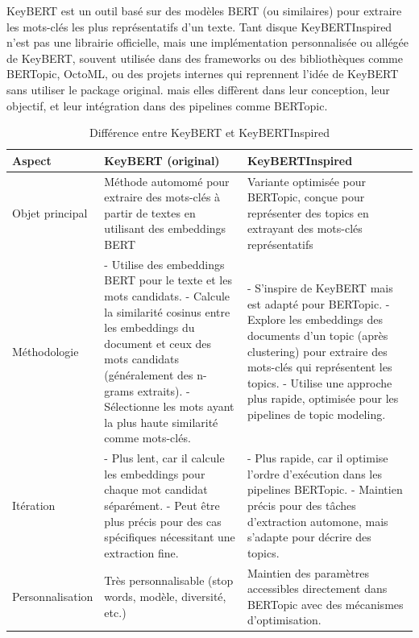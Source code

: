\documentclass[mstat,12pt]{unswthesis}
\begin{document}
\begin{enumerate}
\begin{enumerate}
        \bigskip

        KeyBERT est un outil basé sur des modèles BERT (ou similaires) pour extraire les mots-clés les plus représentatifs d’un texte. Tant disque KeyBERTInspired n’est pas une librairie officielle, mais une implémentation personnalisée ou allégée de KeyBERT, souvent utilisée dans des frameworks ou des bibliothèques comme BERTopic, OctoML, ou des projets internes qui reprennent l'idée de KeyBERT sans utiliser le package original. mais elles diffèrent dans leur conception, leur objectif, et leur intégration dans des pipelines comme BERTopic.


        \begin{table}[H]
        \centering
            \caption{Différence entre KeyBERT et KeyBERTInspired}
            \begin{tabular}{|p{3cm}|p{5cm}|p{5cm}|}
                \hline
                \textbf{Aspect} & \textbf{KeyBERT (original)} & \textbf{KeyBERTInspired} \\
                \hline
                Objet principal & Méthode automomé pour extraire des mots-clés à partir de textes en utilisant des embeddings BERT & Variante optimisée pour BERTopic, conçue pour représenter des topics en extrayant des mots-clés représentatifs \\
                \hline
                Méthodologie & - Utilise des embeddings BERT pour le texte et les mots candidats. - Calcule la similarité cosinus entre les embeddings du document et ceux des mots candidats (généralement des n-grams extraits). - Sélectionne les mots ayant la plus haute similarité comme mots-clés. & - S'inspire de KeyBERT mais est adapté pour BERTopic. - Explore les embeddings des documents d'un topic (après clustering) pour extraire des mots-clés qui représentent les topics. - Utilise une approche plus rapide, optimisée pour les pipelines de topic modeling. \\
                \hline
                Itération & - Plus lent, car il calcule les embeddings pour chaque mot candidat séparément. - Peut être plus précis pour des cas spécifiques nécessitant une extraction fine. & - Plus rapide, car il optimise l'ordre d'exécution dans les pipelines BERTopic. - Maintien précis pour des tâches d'extraction automone, mais s'adapte pour décrire des topics. \\
                \hline
                Personnalisation & Très personnalisable (stop words, modèle, diversité, etc.) & Maintien des paramètres accessibles directement dans BERTopic avec des mécanismes d'optimisation. \\

\end{tabular}
\end{table}
\end{enumerate}
\end{enumerate}
\end{document}
